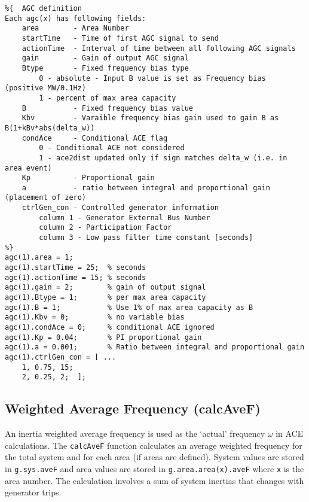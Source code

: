 \begin{verbatim}
%{  AGC definition
Each agc(x) has following fields:
    area        - Area Number 
    startTime   - Time of first AGC signal to send
    actionTime  - Interval of time between all following AGC signals
    gain        - Gain of output AGC signal
    Btype       - Fixed frequency bias type
        0 - absolute - Input B value is set as Frequency bias (positive MW/0.1Hz)
        1 - percent of max area capacity
    B           - Fixed frequency bias value
    Kbv         - Varaible frequency bias gain used to gain B as B(1+kBv*abs(delta_w))
    condAce     - Conditional ACE flag
        0 - Conditional ACE not considered
        1 - ace2dist updated only if sign matches delta_w (i.e. in area event)
    Kp          - Proportional gain
    a           - ratio between integral and proportional gain (placement of zero)
    ctrlGen_con - Controlled generator information
        column 1 - Generator External Bus Number
        column 2 - Participation Factor
        column 3 - Low pass filter time constant [seconds]
%}
agc(1).area = 1;
agc(1).startTime = 25;  % seconds
agc(1).actionTime = 15; % seconds
agc(1).gain = 2;        % gain of output signal
agc(1).Btype = 1;       % per max area capacity
agc(1).B = 1;           % Use 1% of max area capacity as B
agc(1).Kbv = 0;         % no variable bias
agc(1).condAce = 0;     % conditional ACE ignored
agc(1).Kp = 0.04;       % PI proportional gain
agc(1).a = 0.001;       % Ratio between integral and proportional gain
agc(1).ctrlGen_con = [ ...
    1, 0.75, 15;
    2, 0.25, 2;  ];
\end{verbatim}




\subsection{Weighted Average Frequency (calcAveF)} 
An inertia weighted average frequency is used as the `actual' frequency $\omega$ in ACE calculations.
The \verb|calcAveF| function calculates an average weighted frequency for the total system and for each area (if areas are defined).
System values are stored in \verb|g.sys.aveF| and area values are stored in \verb|g.area.area(x).aveF| where \verb|x| is the area number.
The calculation involves a sum of system inertias that changes with generator trips.



